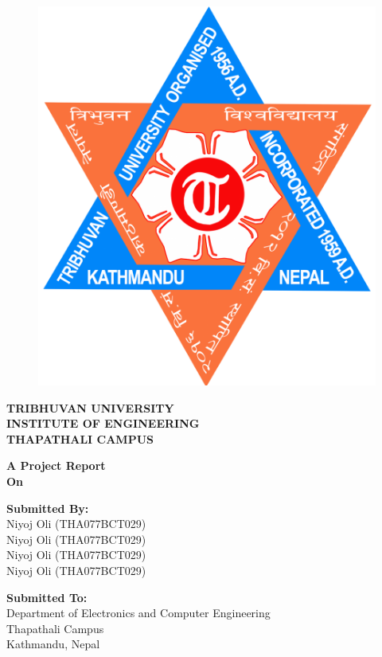 \thispagestyle{empty}   %

\begin{figure}
    \centering
    \includegraphics[scale=0.125]{images/tu_logo.png}
\end{figure}

\begin{center}

\textbf{TRIBHUVAN UNIVERSITY}\\
\textbf{INSTITUTE OF ENGINEERING}\\
\textbf{THAPATHALI CAMPUS}

\textbf{A Project Report}\\
\textbf{On}\\
\textbf{\projectTitle}

\vspace{18pt}

\textbf{Submitted By:}\\
Niyoj Oli (THA077BCT029)\\
Niyoj Oli (THA077BCT029)\\
Niyoj Oli (THA077BCT029)\\
Niyoj Oli (THA077BCT029)

\textbf{Submitted To:}\\
Department of Electronics and Computer Engineering\\
Thapathali Campus\\
Kathmandu, Nepal

\vspace{18pt}
\projectDate

\end{center}
